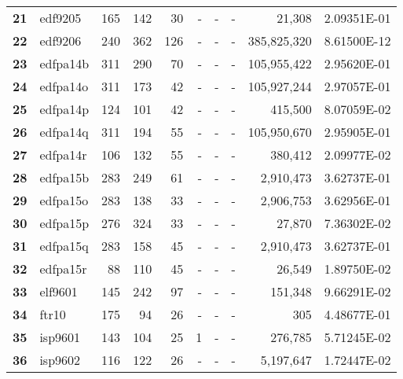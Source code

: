 \begin{longtable}{@{}llrrrrrrrc@{}}
\textbf{21} & edf9205  & 165                  & 142      & 30      & -    & -    & -     & 21,308               & 2.09351E-01 \\
\textbf{22} & edf9206  & 240                  & 362      & 126     & -    & -    & -     & 385,825,320          & 8.61500E-12 \\
\textbf{23} & edfpa14b & 311                  & 290      & 70      & -    & -    & -     & 105,955,422          & 2.95620E-01 \\
\textbf{24} & edfpa14o & 311                  & 173      & 42      & -    & -    & -     & 105,927,244          & 2.97057E-01 \\
\textbf{25} & edfpa14p & 124                  & 101      & 42      & -    & -    & -     & 415,500              & 8.07059E-02 \\
\textbf{26} & edfpa14q & 311                  & 194      & 55      & -    & -    & -     & 105,950,670          & 2.95905E-01 \\
\textbf{27} & edfpa14r & 106                  & 132      & 55      & -    & -    & -     & 380,412              & 2.09977E-02 \\
\textbf{28} & edfpa15b & 283                  & 249      & 61      & -    & -    & -     & 2,910,473            & 3.62737E-01 \\
\textbf{29} & edfpa15o & 283                  & 138      & 33      & -    & -    & -     & 2,906,753            & 3.62956E-01 \\
\textbf{30} & edfpa15p & 276                  & 324      & 33      & -    & -    & -     & 27,870               & 7.36302E-02 \\
\textbf{31} & edfpa15q & 283                  & 158      & 45      & -    & -    & -     & 2,910,473            & 3.62737E-01 \\
\textbf{32} & edfpa15r & 88                   & 110      & 45      & -    & -    & -     & 26,549               & 1.89750E-02 \\
\textbf{33} & elf9601  & 145                  & 242      & 97      & -    & -    & -     & 151,348              & 9.66291E-02 \\
\textbf{34} & ftr10    & 175                  & 94       & 26      & -    & -    & -     & 305                  & 4.48677E-01 \\
\textbf{35} & isp9601  & 143                  & 104      & 25      & 1    & -    & -     & 276,785              & 5.71245E-02 \\
\textbf{36} & isp9602  & 116                  & 122      & 26      & -    & -    & -     & 5,197,647            & 1.72447E-02 \\

\end{longtable}
